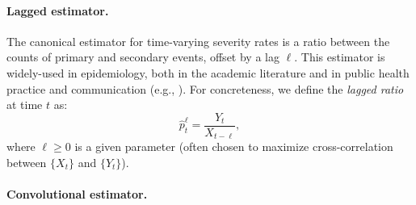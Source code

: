 \documentclass{article}
\renewcommand{\hat}{\widehat} %
\begin{document}
\paragraph{Lagged estimator.} 

The canonical estimator for time-varying severity rates is a ratio between
the counts of primary and secondary events, offset by a lag $\ell$. This
estimator is widely-used in epidemiology, both in the academic literature and in 
public health practice and communication (e.g., \citealp{wsj, atlantic,
  yuan2020monitoring, timevar_ifr, thomas2021estimating, horita2022global,
  LIU2023100350, germany}). For concreteness, we define the \emph{lagged ratio} 
at time $t$ as:   
\begin{equation}
\label{eq:lagged}
\hat{p}_t^\ell = \frac{Y_t}{X_{t-\ell}},
\end{equation}
where $\ell \geq 0$ is a given parameter (often chosen to maximize
cross-correlation between $\{X_t\}$ and $\{Y_t\}$).      

\paragraph{Convolutional estimator.} 
\end{document}
